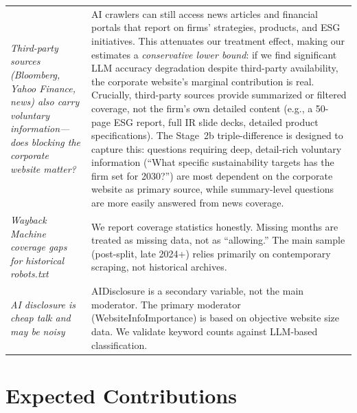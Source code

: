 \documentclass[12pt,a4paper]{article}
\begin{document}
\begin{table}[htbp]
\begin{tabularx}{\textwidth}{p{3.5cm}X}
\textit{Third-party sources (Bloomberg, Yahoo Finance, news) also carry voluntary information---does blocking the corporate website matter?} & AI crawlers can still access news articles and financial portals that report on firms' strategies, products, and ESG initiatives. This attenuates our treatment effect, making our estimates a \emph{conservative lower bound}: if we find significant LLM accuracy degradation despite third-party availability, the corporate website's marginal contribution is real. Crucially, third-party sources provide summarized or filtered coverage, not the firm's own detailed content (e.g., a 50-page ESG report, full IR slide decks, detailed product specifications). The Stage~2b triple-difference is designed to capture this: questions requiring deep, detail-rich voluntary information (``What specific sustainability targets has the firm set for 2030?'') are most dependent on the corporate website as primary source, while summary-level questions are more easily answered from news coverage. \\
\addlinespace
\textit{Wayback Machine coverage gaps for historical robots.txt} & We report coverage statistics honestly. Missing months are treated as missing data, not as ``allowing.'' The main sample (post-split, late 2024+) relies primarily on contemporary scraping, not historical archives. \\
\addlinespace
\textit{AI disclosure is cheap talk and may be noisy} & AIDisclosure is a secondary variable, not the main moderator. The primary moderator (WebsiteInfoImportance) is based on objective website size data. We validate keyword counts against LLM-based classification. \\
\bottomrule
\end{tabularx}
\end{table}

\section{Expected Contributions}
\end{document}
